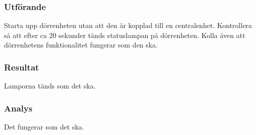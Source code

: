 \subsubsection*{Utförande}
Starta upp dörrenheten utan att den är kopplad till en centralenhet.
Kontrollera så att efter ca 20 sekunder tänds statuslampan
på dörrenheten. Kolla även att dörrenhetens funktionalitet 
fungerar som den ska. 


\subsubsection*{Resultat}
Lamporna tänds som det ska.



\subsubsection*{Analys}
Det fungerar som det ska.


